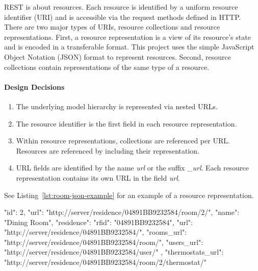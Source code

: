 REST is about resources.
Each resource is identified by a uniform resource identifier (URI) and is accessible via the request methods defined in HTTP.
There are two major types of URIs, resource collections and resource representations.
First, a resource representation is a view of its resource's state and is encoded in a transferable format.
This project uses the simple JavaScript Object Notation (JSON) format to represent resources.
Second, resource collections contain representations of the same type of a resource.

\paragraph{Design Decisions}

\begin{enumerate}
    \itemsep0em
    \item The underlying model hierarchy is represented via nested URLs.
    \label{enum:design_decision_nested_urls}
    \item The resource identifier is the first field in each resource representation.
    \item Within resource representations, collections are referenced per URL. Resources are referenced by including their representation.
    \label{enum:design_decision_resource_referencing}
    \item URL fields are identified by the name \emph{url} or the suffix \emph{\_url}. Each resource representation contains its own URL in the field \emph{url}.
    \label{enum:design_decision_url_fields_prefix}
\end{enumerate}

See Listing~\ref{lst:room-json-example} for an example of a resource representation.

\begin{snippet}[language=JavaScript,label={lst:room-json-example},caption={Example representation of the Room resource at \nolinkurl{http://server/residence/04891BB9232584/room/2/}. The \emph{url} field determines the URL of the represented resource. Within the \emph{residence} field the representation of the associated Residence resource is nested. The included Residence representation has its own \emph{url} field. Collections of the Residence's Rooms and Users are not nested but referenced via URL to limit the response size.}]
	{
		"id": 2,
		"url": "http://server/residence/04891BB9232584/room/2/",
		"name": "Dining Room",
		"residence": {
			"rfid": "04891BB9232584",
			"url": "http://server/residence/04891BB9232584/",
			"rooms_url": "http://server/residence/04891BB9232584/room/",
			"users_url": "http://server/residence/04891BB9232584/user/"
		},
		"thermostats_url": "http://server/residence/04891BB9232584/room/2/thermostat/"
	}
\end{snippet}


